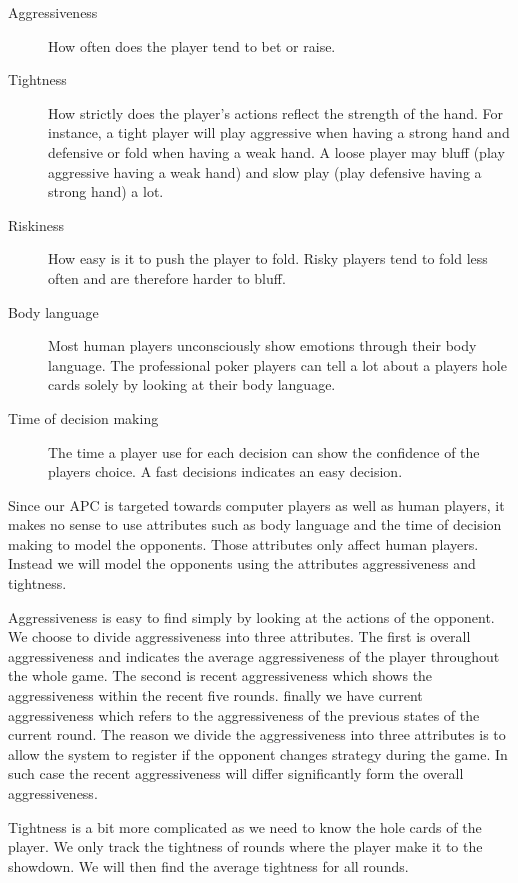 \begin{description}
\item[Aggressiveness] How often does the player tend to bet or raise.
\item[Tightness] How strictly does the player's actions reflect the strength of the hand. For instance, a tight player will play aggressive when having a strong hand and defensive or fold when having a weak hand. A loose player may bluff (play aggressive having a weak hand) and slow play (play defensive having a strong hand) a lot.
\item[Riskiness] How easy is it to push the player to fold. Risky players tend to fold less often and are therefore harder to bluff.
\item[Body language] Most human players unconsciously show emotions through their body language. The professional poker players can tell a lot about a players hole cards solely by looking at their body language.
\item[Time of decision making] The time a player use for each decision can show the confidence of the players choice. A fast decisions indicates an easy decision. 
\end{description}

Since our APC is targeted towards computer players as well as human players, it makes no sense to use attributes such as body language and the time of decision making to model the opponents. Those attributes only affect human players. Instead we will model the opponents using the attributes aggressiveness and tightness.

Aggressiveness is easy to find simply by looking at the actions of the opponent. We choose to divide aggressiveness into three attributes. The first is overall aggressiveness and indicates the average aggressiveness of the player throughout the whole game. The second is recent aggressiveness which shows the aggressiveness within the recent five rounds. finally we have current aggressiveness which refers to the aggressiveness of the previous states of the current round. 
The reason we divide the aggressiveness into three attributes is to allow the system to register if the opponent changes strategy during the game. In such case the recent aggressiveness will differ significantly form the overall aggressiveness. 

Tightness is a bit more complicated as we need to know the hole cards of the player. We only track the tightness of rounds where the player make it to the showdown. We will then find the average tightness for all rounds.

